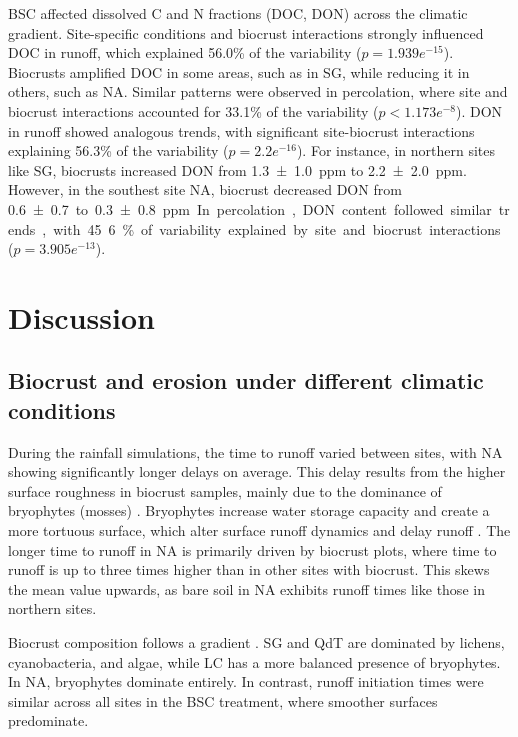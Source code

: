 BSC affected dissolved C and N fractions (DOC, DON) across the climatic gradient. Site-specific conditions and biocrust interactions strongly influenced DOC in runoff, which explained 56.0\% of the variability ($p = 1.939e^{-15}$). Biocrusts amplified DOC in some areas, such as in SG, while reducing it in others, such as NA. Similar patterns were observed in percolation, where site and biocrust interactions accounted for 33.1\% of the variability ($p < 1.173e^{-8}$). DON in runoff showed analogous trends, with significant site-biocrust interactions explaining 56.3\% of the variability ($p = 2.2e^{-16}$). For instance, in northern sites like SG, biocrusts increased DON from \SI[separate-uncertainty,multi-part-units=single]{1.3 \pm 1.0}{ppm} to \SI[separate-uncertainty,multi-part-units=single]{2.2 \pm 2.0}{ppm}. However, in the southest site NA, biocrust decreased DON from \SI[separate-uncertainty,multi-part-units=single]{0.6 \pm 0.7} to \SI[separate-uncertainty,multi-part-units=single]{0.3 \pm 0.8}{ppm}. In percolation, DON content followed similar trends, with 45.6\% of variability explained by site and biocrust interactions ($p = 3.905e^{-13}$).

\section{Discussion}
\subsection{Biocrust and erosion under different climatic conditions}

During the rainfall simulations, the time to runoff varied between sites, with NA showing significantly longer delays on average. This delay results from the higher surface roughness in biocrust samples, mainly due to the dominance of bryophytes (mosses) \citep{RiverasMunoz2022}. Bryophytes increase water storage capacity and create a more tortuous surface, which alter surface runoff dynamics and delay runoff \citep{Chamizo2016,Juan2023,Zeng2025}. The longer time to runoff in NA is primarily driven by biocrust plots, where time to runoff is up to three times higher than in other sites with biocrust. This skews the mean value upwards, as bare soil in NA exhibits runoff times like those in northern sites.

Biocrust composition follows a gradient \citep{RiverasMunoz2022}. SG and QdT are dominated by lichens, cyanobacteria, and algae, while LC has a more balanced presence of bryophytes. In NA, bryophytes dominate entirely. In contrast, runoff initiation times were similar across all sites in the BSC treatment, where smoother surfaces predominate.

